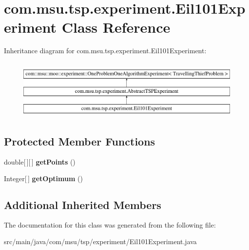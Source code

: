 \hypertarget{classcom_1_1msu_1_1tsp_1_1experiment_1_1Eil101Experiment}{\section{com.\-msu.\-tsp.\-experiment.\-Eil101\-Experiment Class Reference}
\label{classcom_1_1msu_1_1tsp_1_1experiment_1_1Eil101Experiment}
}
Inheritance diagram for com.\-msu.\-tsp.\-experiment.\-Eil101\-Experiment\-:\begin{figure}[H]
\begin{center}
\leavevmode
\includegraphics[height=3.000000cm]{classcom_1_1msu_1_1tsp_1_1experiment_1_1Eil101Experiment}
\end{center}
\end{figure}
\subsection*{Protected Member Functions}
\begin{DoxyCompactItemize}
\item 
\hypertarget{classcom_1_1msu_1_1tsp_1_1experiment_1_1Eil101Experiment_a50b38827fb85b4c9332c0c9fb2461dd6}{double\mbox{[}$\,$\mbox{]}\mbox{[}$\,$\mbox{]} {\bfseries get\-Points} ()}\label{classcom_1_1msu_1_1tsp_1_1experiment_1_1Eil101Experiment_a50b38827fb85b4c9332c0c9fb2461dd6}

\item 
\hypertarget{classcom_1_1msu_1_1tsp_1_1experiment_1_1Eil101Experiment_af3d1b555dfc01d1efa2969d8a7b4c7ed}{Integer\mbox{[}$\,$\mbox{]} {\bfseries get\-Optimum} ()}\label{classcom_1_1msu_1_1tsp_1_1experiment_1_1Eil101Experiment_af3d1b555dfc01d1efa2969d8a7b4c7ed}

\end{DoxyCompactItemize}
\subsection*{Additional Inherited Members}


The documentation for this class was generated from the following file\-:\begin{DoxyCompactItemize}
\item 
src/main/java/com/msu/tsp/experiment/Eil101\-Experiment.\-java\end{DoxyCompactItemize}
